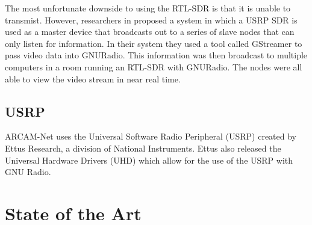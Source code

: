 	The most unfortunate downside to using the RTL-SDR is that it is unable to transmist. However, researchers in \cite{6922233} proposed a system in which a USRP SDR is used as a master device that broadcasts out to a series of slave nodes that can only listen for information. In their system they used a tool called GStreamer to pass video data into GNURadio. This information was then broadcast to multiple computers in a room running an RTL-SDR with GNURadio. The nodes were all able to view the video stream in near real time.  

\subsection{USRP}

ARCAM-Net uses the Universal Software Radio Peripheral (USRP) created by Ettus Research, a division of National Instruments\cite{0006}. Ettus also released the Universal Hardware Drivers (UHD) \cite{0007} which allow for the use of the USRP with GNU Radio.


\section{State of the Art}

